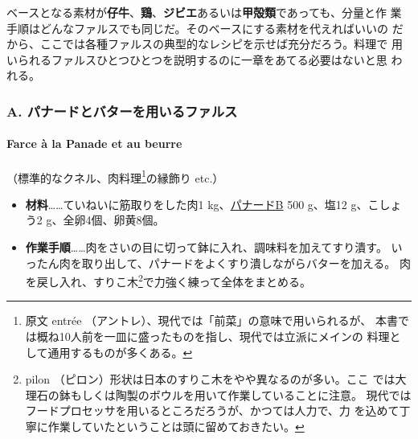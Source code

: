 ベースとなる素材が\textbf{仔牛}、\textbf{鶏}、\textbf{ジビエ}あるいは\textbf{甲殻類}であっても、分量と作
業手順はどんなファルスでも同じだ。そのベースにする素材を代えればいいの
だから、ここでは各種ファルスの典型的なレシピを示せば充分だろう。料理で
用いられるファルスひとつひとつを説明するのに一章をあてる必要はないと思
われる。
\begin{recette}
\hypertarget{a.-ux30d1ux30caux30fcux30c9ux3068ux30d0ux30bfux30fcux3092ux7528ux3044ux308bux30d5ux30a1ux30ebux30b9}{%
\subsubsection{A.
パナードとバターを用いるファルス}\label{a.-ux30d1ux30caux30fcux30c9ux3068ux30d0ux30bfux30fcux3092ux7528ux3044ux308bux30d5ux30a1ux30ebux30b9}}

\hypertarget{farce-a}{%
\paragraph{Farce à la Panade et au beurre}\label{farce-a}}


（標準的なクネル、肉料理\footnote{原文 entrée
  （アントレ）、現代では「前菜」の意味で用いられるが、
  本書では概ね10人前を一皿に盛ったものを指し、現代では立派にメインの
  料理として通用するものが多くある。}の縁飾り etc.）

\begin{itemize}
\item
  \textbf{材料}\ldots{}\ldots{}ていねいに筋取りをした肉1
  kg、\protect\hyperlink{panade-b}{パナードB} 500 g、塩12 g、こしょう2
  g、全卵4個、卵黄8個。
\item
  \textbf{作業手順}\ldots{}\ldots{}肉をさいの目に切って鉢に入れ、調味料を加えてすり潰す。
  いったん肉を取り出して、パナードをよくすり潰しながらバターを加える。
  肉を戻し入れ、すりこ木\footnote{pilon
    （ピロン）形状は日本のすりこ木をやや異なるのが多い。ここ
    では大理石の鉢もしくは陶製のボウルを用いて作業していることに注意。
    現代ではフードプロセッサを用いるところだろうが、かつては人力で、力
    を込めて丁寧に作業していたということは頭に留めておきたい。}で力強く練って全体をまとめる。
\end{itemize}


\end{recette}
